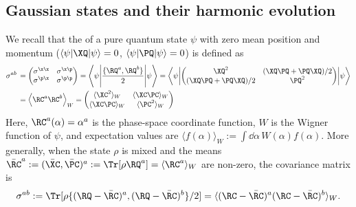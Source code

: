 \documentclass{article}
\numberwithin{equation}{section}
\begin{document}
\subsection{Gaussian states and their harmonic evolution}\label{sec:harmonic-gaussian}

We recall that the  of a pure quantum state $\psi$ with zero mean position and momentum ($\langle \psi | \XQ |\psi \rangle = 0$, $\langle \psi | \PQ| \psi \rangle = 0$) is defined as
\begin{align}
        \label{eq:covariance-def}
	\sigma^{ab}\, 
	&= \begin{pmatrix}
		\sigma^{\x\x} & \sigma^{\x\p} \\
		\sigma^{\p\x} & \sigma^{\p\p}
	\end{pmatrix}
    =  \left\langle \psi\middle| \frac{\{\RQ^a,\RQ^b\}}{2} \middle|\psi \right\rangle
	= \left\langle \psi\middle|\begin{pmatrix}
		 \XQ^2   &  (\XQ\PQ+\PQ\XQ)/2  \\
		(\XQ\PQ+\PQ\XQ)/2  &  \PQ^2 
	\end{pmatrix}\middle|\psi \right\rangle \\
	&=  \left\langle \RC^a \RC^b \right\rangle_W
	= \begin{pmatrix}
		\langle  \XC^2 \rangle_W  & \langle  \XC\PC  \rangle_W \\
		\langle  \XC\PC  \rangle_W & \langle \PC^2  \rangle_W
	\end{pmatrix}
\end{align}
Here, $\RC^a(\alpha) = \alpha^a$ is the phase-space coordinate function, $W$ is the Wigner function of $\psi$, and expectation values are $\langle  f(\alpha) \rangle_W := \int \! \dd \alpha\, W(\alpha) f(\alpha)$. More generally, when the state $\rho$ is mixed and the means
$\bar{\RC}^a:= (\bar{\XC},\bar{\PC})^a := \Tr[\rho \RQ^a ] = \langle \RC^a \rangle_W$ are non-zero,
the covariance matrix is 
\begin{align}\label{eq:sigma-def}
	\sigma^{ab}
	:= \Tr[\rho \{(\RQ-\bar{\RC})^a,(\RQ-\bar{\RC})^b\}/2 ] =  \langle (\RC-\bar{\RC})^a(\RC-\bar{\RC})^b \rangle_W.
\end{align}
\end{document}
